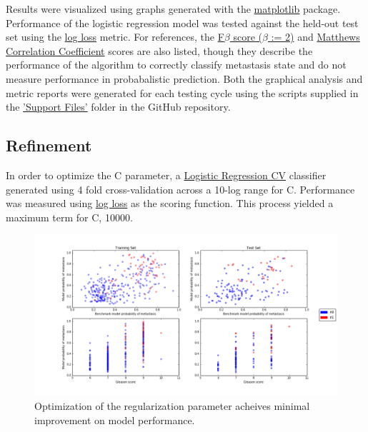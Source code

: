 \documentclass[final]{article}
\begin{document}
Results were visualized using graphs generated with the
\href{http://matplotlib.org/index.html}{matplotlib} package.  Performance of the
logistic regression model was tested against the held-out test set using the
\href{http://scikit-learn.org/stable/modules/generated/sklearn.metrics.log_loss.html#sklearn.metrics.log_loss}{log
loss} metric.  For references, the
\href{http://scikit-learn.org/stable/modules/generated/sklearn.metrics.fbeta_score.html}{F$\beta$
score ($\beta$ := 2)} and
\href{http://scikit-learn.org/stable/modules/generated/sklearn.metrics.matthews_corrcoef.html}{Matthews
Correlation Coefficient} scores are also listed, though they describe the
performance of the algorithm to correctly classify metastasis state and do not
measure performance in probabalistic prediction.  Both the graphical analysis
and metric reports were generated for each testing cycle using the scripts
supplied in the
\href{https://github.com/CCThompson82/MLE_capstone/tree/master/Support%20Files}{'Support
Files'} folder in the GitHub repository.

\subsection{Refinement}

In order to optimize the C parameter, a \href{http://scikit-learn.org/stable/modules/generated/sklearn.linear_model.LogisticRegressionCV.html#sklearn.linear_model.LogisticRegressionCV}{Logistic Regression CV}
classifier generated using 4 fold cross-validation across a 10-log range for C.
Performance was measured using \href{http://scikit-learn.org/stable/modules/generated/sklearn.metrics.log_loss.html#sklearn.metrics.log_loss}{log loss}
as the  scoring function.  This process yielded a maximum term for C, 10000.

\begin{figure} [h!]
  \centering
    \includegraphics[width=\textwidth]{optPC3}
    \caption{\label{fig:PC3}Optimization of the regularization parameter acheives minimal improvement on model performance.}
\end{figure}
\end{document}
